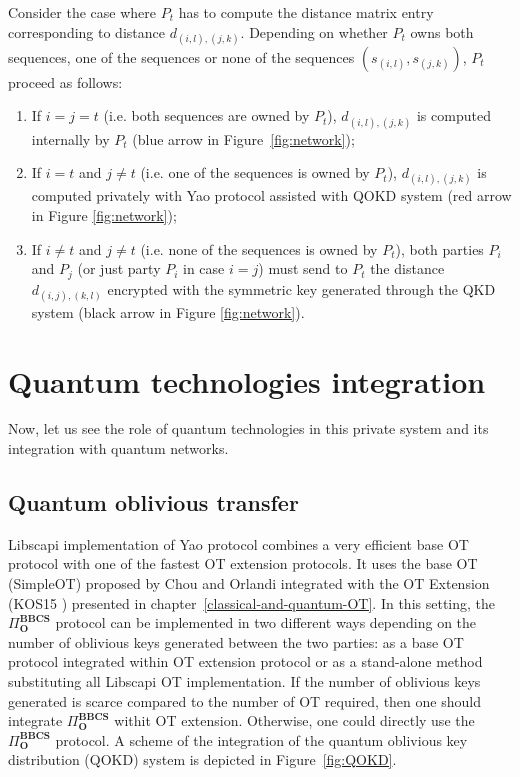 Consider the case where $P_t$ has to compute the distance matrix entry corresponding to distance $d_{(i,l), (j, k)}$. Depending on whether $P_t$ owns both sequences, one of the sequences or none of the sequences $(s_{(i,l)}, s_{(j,k)})$, $P_t$ proceed as follows:

\begin{enumerate}
    \item If $i=j=t$ (i.e. both sequences are owned by $P_t$), $d_{(i,l),(j,k)}$ is computed internally by $P_t$ (blue arrow in Figure~\ref{fig:network});
    \item If $i=t$ and $j\neq t$ (i.e. one of the sequences is owned by $P_t$), $d_{(i,l),(j,k)}$ is computed privately with Yao protocol assisted with QOKD system (red arrow in Figure \ref{fig:network});
    \item If $i\neq t$ and $j\neq t$ (i.e. none of the sequences is owned by $P_t$), both parties $P_i$ and $P_j$ (or just party $P_i$ in case $i=j$) must send to $P_t$ the distance $d_{(i,j),(k,l)}$ encrypted with the symmetric key generated through the QKD system (black arrow in Figure \ref{fig:network}).
\end{enumerate}


\section{Quantum technologies integration}\label{quantumTechIntegration}

Now, let us see the role of quantum technologies in this private system and its integration with quantum networks.

\subsection{Quantum oblivious transfer} \label{quantumTechIntegQOT}

Libscapi implementation of Yao protocol combines a very efficient base OT protocol with one of the fastest OT extension protocols. It uses the base OT (SimpleOT) proposed by Chou and Orlandi \cite{C15} integrated with the OT Extension (KOS15 \cite{KOS15}) presented in chapter~\ref{classical-and-quantum-OT}. In this setting, the $\Pi^{\textbf{BBCS}}_{\textbf{O}}$ protocol can be implemented in two different ways depending on the number of oblivious keys generated between the two parties: as a base OT protocol integrated within OT extension protocol or as a stand-alone method substituting all Libscapi OT implementation. If the number of oblivious keys generated is scarce compared to the number of OT required, then one should integrate  $\Pi^{\textbf{BBCS}}_{\textbf{O}}$ withit OT extension. Otherwise, one could directly use the  $\Pi^{\textbf{BBCS}}_{\textbf{O}}$ protocol. A scheme of the integration of the quantum oblivious key distribution (QOKD) system is depicted in Figure~\ref{fig:QOKD}.


